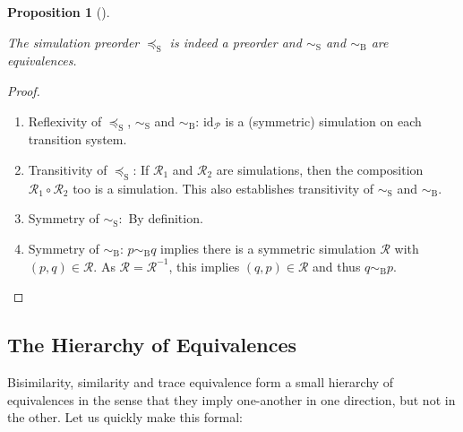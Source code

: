 \documentclass[
  a4paper,
]{report}
\providecommand{\tightlist}{%
  \setlength{\itemsep}{0pt}\setlength{\parskip}{0pt}}\usepackage{longtable,booktabs,array}
\theoremstyle{plain}
\newtheorem{proposition}{Proposition}[section]
\theoremstyle{plain}
\theoremstyle{definition}
\theoremstyle{plain}
\theoremstyle{definition}
\theoremstyle{remark}
\begin{document}
\begin{proposition}[]\protect\hypertarget{prp-sim-eq-rel}{}\label{prp-sim-eq-rel}

The simulation preorder \(\preceq_\mathrm{S}\) is indeed a preorder and
\(\sim_\mathrm{S}\) and \(\sim_\mathrm{B}\) are equivalences.

\end{proposition}

\begin{proof}
\leavevmode

\begin{enumerate}
\def\labelenumi{\arabic{enumi}.}
\tightlist
\item
  Reflexivity of \(\preceq_\mathrm{S}\), \(\sim_\mathrm{S}\) and
  \(\sim_\mathrm{B}\): \(\mathrm{id}_{\mathcal{P}}\) is a (symmetric)
  simulation on each transition system.
\item
  Transitivity of \(\preceq_\mathrm{S}\): If \(\mathcal{R}_1\) and
  \(\mathcal{R}_2\) are simulations, then the composition
  \(\mathcal{R}_1 \circ \mathcal{R}_2\) too is a simulation. This also
  establishes transitivity of \(\sim_\mathrm{S}\) and
  \(\sim_\mathrm{B}\).
\item
  Symmetry of \(\sim_\mathrm{S}:\) By definition.
\item
  Symmetry of \(\sim_\mathrm{B}\): \(p \sim_\mathrm{B} q\) implies there
  is a symmetric simulation \(\mathcal{R}\) with
  \((p,q) \in \mathcal{R}\). As \(\mathcal{R} = \mathcal{R}^{-1}\), this
  implies \((q,p) \in \mathcal{R}\) and thus \(q \sim_\mathrm{B} p\).
\end{enumerate}

\end{proof}

\subsection{The Hierarchy of
Equivalences}\label{the-hierarchy-of-equivalences}

Bisimilarity, similarity and trace equivalence form a small hierarchy of
equivalences in the sense that they imply one-another in one direction,
but not in the other. Let us quickly make this formal:
\end{document}
